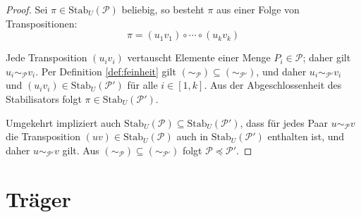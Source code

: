 \begin{proof}
Sei $\pi\in\mathrm{Stab}_{U}\left(\mathcal{P}\right)$ beliebig, so
besteht $\pi$ aus einer Folge von Transpositionen:
\[
\pi=\left(u_{1}v_{1}\right)\circ\cdots\circ\left(u_{k}v_{k}\right)
\]

Jede Transposition $\left(u_{i}v_{i}\right)$ vertauscht Elemente
einer Menge $P_{i}\in\mathcal{P}$; daher gilt $u_{i}\sim_{\mathcal{P}}v_{i}$.
Per Definition \ref{def:feinheit} gilt $\left(\sim_{\mathcal{P}}\right)\subseteq\left(\sim_{\mathcal{P}'}\right)$,
und daher $u_{i}\sim_{\mathcal{P}'}v_{i}$ und $\left(u_{i}v_{i}\right)\in\mathrm{Stab}_{U}\left(\mathcal{P}'\right)$
für alle $i\in\left[1,k\right]$. Aus der Abgeschlossenheit des Stabilisators
folgt $\pi\in\mathrm{Stab}_{U}\left(\mathcal{P}'\right)$.

Umgekehrt impliziert auch $\mathrm{Stab}_{U}\left(\mathcal{P}\right)\subseteq\mathrm{Stab}_{U}\left(\mathcal{P}'\right)$,
dass für jedes Paar $u\sim_{\mathcal{P}}v$ die Transposition $\left(uv\right)\in\mathrm{Stab}_{U}\left(\mathcal{P}\right)$
auch in $\mathrm{Stab}_{U}\left(\mathcal{P}'\right)$ enthalten ist,
und daher $u\sim_{\mathcal{P}'}v$ gilt. Aus $\left(\sim_{\mathcal{P}}\right)\subseteq\left(\sim_{\mathcal{P}'}\right)$
folgt $\mathcal{P}\preceq\mathcal{P}'$.
\end{proof}

\section{Träger}


